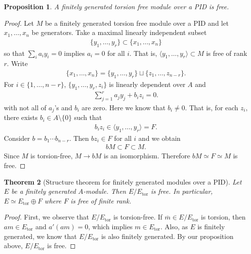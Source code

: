 \documentclass[12pt]{report}
\theoremstyle{plain}
\newtheorem{theorem}{Theorem}[section]
\newtheorem{proposition}[theorem]{Proposition}
\theoremstyle{remark}
\theoremstyle{definition}
\begin{document}
\begin{proposition}
    A finitely generated torsion free module over a PID is free.
\end{proposition}
\begin{proof}
    Let $M$ be a finitely generated torsion free module over a PID and let $x_1,\dots,x_n$ be generators. Take a maximal linearly independent subset
    \begin{align*}
        \{y_1,\dots,y_r\}\subset \{x_1,\dots,x_n\}
    \end{align*}
    so that $\sum_i a_iy_i=0$ implies $a_i=0$ for all $i$. That is, $\langle y_1,\dots,y_r\rangle\subset M$ is free of rank $r$. Write
    \begin{align*}
        \{x_1,\dots,x_n\} = \{y_1,\dots,y_r\}\sqcup \{z_1,\dots,z_{n-r}\}.
    \end{align*}
    For $i\in \{1,\dots,n-r\}$, $\{y_1,\dots,y_r,z_i\}$ is linearly dependent over $A$ and
    \begin{align*}
        \sum_{j=1}^r a_jy_j + b_iz_i = 0.
    \end{align*}
    with not all of $a_j$'s and $b_i$ are zero. Here we know that $b_i\neq 0$. That is, for each $z_i$, there exists $b_i\in A\setminus\{0\}$ such that
    \begin{align*}
        b_iz_i\in\langle y_1,\dots,y_r\rangle = F.
    \end{align*}
    Consider $b=b_1\cdots b_{n-r}$. Then $bz_i\in F$ for all $i$ and we obtain
    \begin{align*}
        bM\subset F\subset M.
    \end{align*}
    Since $M$ is torsion-free, $M\to bM$ is an isomorphism. Therefore $bM\simeq F\simeq M$ is free.
\end{proof}

\begin{theorem}[Structure theorem for finitely generated modules over a PID]
    Let $E$ be a finitely generated $A$-module. Then $E/E_\mathrm{tor}$ is free. In particular, $E\simeq E_\mathrm{tor}\oplus F$ where $F$ is free of finite rank.
\end{theorem}
\begin{proof}
    First, we observe that $E/E_\mathrm{tor}$ is torsion-free. If $\overline{m}\in E/E_\mathrm{tor}$ is torsion, then $am\in E_\mathrm{tor}$ and $a'(am)=0$, which implies $m\in E_\mathrm{tor}$. Also, as $E$ is finitely generated, we know that $E/E_\mathrm{tor}$ is also finitely generated. By our proposition above, $E/E_\mathrm{tor}$ is free.
\end{proof}
\end{document}
